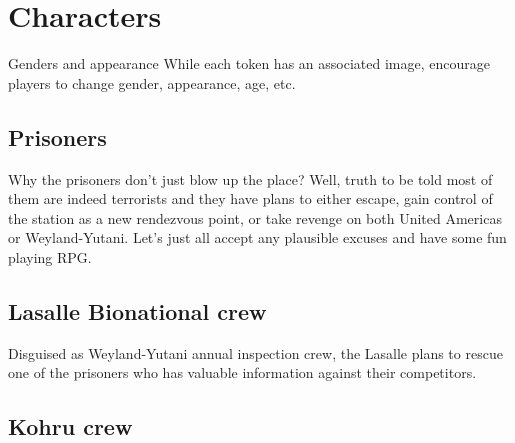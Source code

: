 \chapter{Characters}


\begin{rpg-warnbox}{Genders and appearance}
    While each token has an associated image, encourage players to change gender, appearance, age, etc.
\end{rpg-warnbox}



\section{Prisoners}

Why the prisoners don't just blow up the place? Well, truth to be told most of them are indeed terrorists and they have plans to either escape, gain control of the station as a new rendezvous point, or take revenge on both United Americas or  Weyland-Yutani. Let's just all accept any plausible excuses and have some fun playing RPG. 




\clearpage


\section{Lasalle Bionational crew}

Disguised as Weyland-Yutani annual inspection crew, the Lasalle plans to rescue one of the prisoners who has valuable information against their competitors.



\clearpage




\section{Kohru crew}







